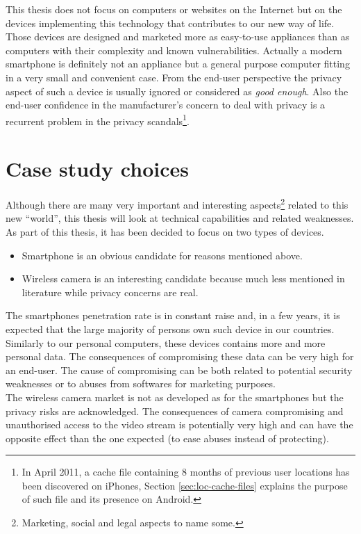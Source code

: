 This thesis does not focus on computers or websites on the Internet but on the devices implementing this technology that contributes to our new way of life.
Those devices are designed and marketed more as easy-to-use appliances than as computers with their complexity and known vulnerabilities.
Actually a modern smartphone is definitely not an appliance but a general purpose computer fitting in a very small and convenient case.
From the end-user perspective the privacy aspect of such a device is usually ignored or considered as \emph{good enough}.
Also the end-user confidence in the manufacturer’s concern to deal with privacy is a recurrent problem in the privacy scandals\footnote{In April 2011, a cache file containing 8 months of previous user locations has been discovered on iPhones, Section \ref{sec:loc-cache-files} explains the purpose of such file and its presence on Android.}.

\section{Case study choices}

Although there are many very important and interesting aspects\footnote{Marketing, social and legal aspects to name some.} related to this new ``world'', this thesis will look at technical capabilities and related weaknesses.
As part of this thesis, it has been decided to focus on two types of devices.
\begin{itemize}
\item Smartphone is an obvious candidate for reasons mentioned above.
\item Wireless camera is an interesting candidate because much less mentioned in literature while privacy concerns are real.
\end{itemize}

The smartphones penetration rate is in constant raise and, in a few years, it is expected that the large majority of persons own such device in our countries.
Similarly to our personal computers, these devices contains more and more personal data.
The consequences of compromising these data can be very high for an end-user.
The cause of compromising can be both related to potential security weaknesses or to abuses from softwares for marketing purposes.\\

The wireless camera market is not as developed as for the smartphones but the privacy risks are acknowledged.
The consequences of camera compromising and unauthorised access to the video stream is potentially very high and can have the opposite effect than the one expected (to ease abuses instead of protecting).\\

